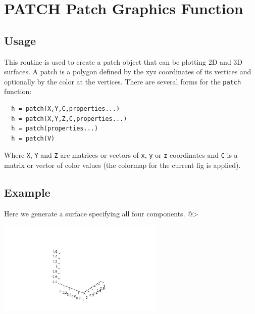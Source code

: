 \section{PATCH Patch Graphics Function
}

\subsection{Usage}

This routine is used to create a patch object that can be plotting 2D and 3D surfaces.  A 
patch is a polygon defined by the xyz coordinates
of its vertices and optionally by the color at the vertices.
There are several forms for the \verb|patch| function:
\begin{verbatim}
  h = patch(X,Y,C,properties...)
  h = patch(X,Y,Z,C,properties...)
  h = patch(properties...)
  h = patch(V)
\end{verbatim}
Where \verb|X|, \verb|Y| and \verb|Z| are matrices or vectors of \verb|x|, \verb|y| or \verb|z| coordinates
and \verb|C| is a matrix or vector of color values (the colormap
for the current fig is applied).  
\subsection{Example}

Here we generate a surface specifying all four components.
@>


\centerline{\includegraphics[width=8cm]{patch1}}

